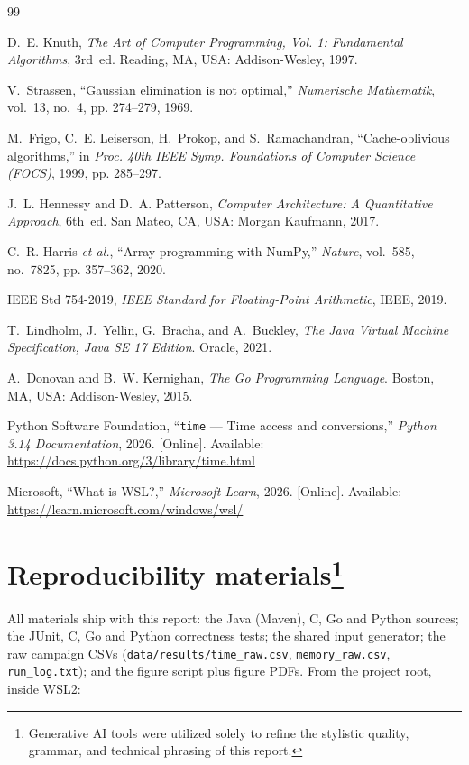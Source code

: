 \documentclass[11pt,a4paper]{article}
\begin{document}
\begin{thebibliography}{99}

D.~E. Knuth, \emph{The Art of Computer Programming, Vol. 1: Fundamental
Algorithms}, 3rd~ed. Reading, MA, USA: Addison-Wesley, 1997.

V.~Strassen, ``Gaussian elimination is not optimal,'' \emph{Numerische
Mathematik}, vol.~13, no.~4, pp. 274--279, 1969.

M.~Frigo, C.~E. Leiserson, H.~Prokop, and S.~Ramachandran, ``Cache-oblivious
algorithms,'' in \emph{Proc. 40th IEEE Symp. Foundations of Computer Science
(FOCS)}, 1999, pp. 285--297.

J.~L. Hennessy and D.~A. Patterson, \emph{Computer Architecture: A
Quantitative Approach}, 6th~ed. San Mateo, CA, USA: Morgan Kaufmann, 2017.

C.~R. Harris \emph{et al.}, ``Array programming with NumPy,'' \emph{Nature},
vol.~585, no.~7825, pp. 357--362, 2020.

IEEE Std 754-2019, \emph{IEEE Standard for Floating-Point Arithmetic}, IEEE,
2019.

T.~Lindholm, J.~Yellin, G.~Bracha, and A.~Buckley, \emph{The Java Virtual
Machine Specification, Java SE 17 Edition}. Oracle, 2021.

A.~Donovan and B.~W. Kernighan, \emph{The Go Programming Language}.
Boston, MA, USA: Addison-Wesley, 2015.

Python Software Foundation, ``\texttt{time} --- Time access and conversions,''
\emph{Python 3.14 Documentation}, 2026. [Online]. Available:
\url{https://docs.python.org/3/library/time.html}

Microsoft, ``What is WSL?,'' \emph{Microsoft Learn}, 2026. [Online].
Available: \url{https://learn.microsoft.com/windows/wsl/}

\end{thebibliography}

\section[Reproducibility materials]{Reproducibility materials\footnote{Generative AI tools were utilized solely to refine the stylistic quality, grammar, and technical phrasing of this report.}}

All materials ship with this report: the Java (Maven), C, Go and Python
sources; the JUnit, C, Go and Python correctness tests; the shared input
generator; the raw campaign CSVs (\texttt{data/results/time\_raw.csv},
\texttt{memory\_raw.csv}, \texttt{run\_log.txt}); and the figure script plus
figure PDFs. From the project root, inside WSL2:
\end{document}

